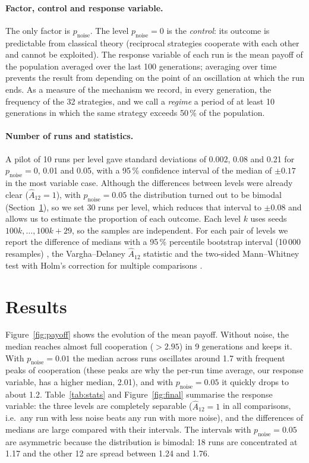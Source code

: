 \documentclass[10pt,a4paper]{article}
\newcommand{\pn}{p_{\text{noise}}}
\newcommand{\Atwelve}{\hat{A}_{12}}
\begin{document}
\paragraph{Factor, control and response variable.} The only factor is $\pn$. The level $\pn=0$ is the
\emph{control}: its outcome is predictable from classical theory \cite{axelrod1987} (reciprocal strategies
cooperate with each other and cannot be exploited). The response variable of each run is the mean payoff of
the population averaged over the last 100 generations; averaging over time prevents the result from
depending on the point of an oscillation at which the run ends. As a measure of the mechanism we record, in
every generation, the frequency of the 32 strategies, and we call a \emph{regime} a period of at least 10
generations in which the same strategy exceeds 50\,\% of the population.

\paragraph{Number of runs and statistics.} A pilot of 10 runs per level gave standard deviations of 0.002,
0.08 and 0.21 for $\pn=0$, 0.01 and 0.05, with a 95\,\% confidence interval of the median of $\pm0.17$ in
the most variable case. Although the differences between levels were already clear ($\Atwelve=1$), with
$\pn=0.05$ the distribution turned out to be bimodal (Section~\ref{sec:res}), so we set 30 runs per level,
which reduces that interval to $\pm0.08$ and allows us to estimate the proportion of each outcome. Each
level $k$ uses seeds $100k,\dots,100k+29$, so the samples are independent. For each pair of levels we report
the difference of medians with a 95\,\% percentile bootstrap interval (10\,000 resamples) \cite{efron1993},
the Vargha--Delaney $\Atwelve$ statistic \cite{vargha2000,arcuri2011} and the two-sided Mann--Whitney test
with Holm's correction for multiple comparisons \cite{holm1979}.

\section{Results}\label{sec:res}
Figure~\ref{fig:payoff} shows the evolution of the mean payoff. Without noise, the median reaches almost
full cooperation ($>2.95$) in 9 generations and keeps it. With $\pn=0.01$ the median across runs oscillates
around 1.7 with frequent peaks of cooperation (these peaks are why the per-run time average, our response
variable, has a higher median, 2.01), and with $\pn=0.05$ it quickly drops to about 1.2.
Table~\ref{tab:stats} and Figure~\ref{fig:final} summarise the response variable: the three levels are
completely separable ($\Atwelve=1$ in all comparisons, i.e.\ any run with less noise beats any run with more
noise), and the differences of medians are large compared with their intervals. The intervals with
$\pn=0.05$ are asymmetric because the distribution is bimodal: 18 runs are concentrated at 1.17 and the
other 12 are spread between 1.24 and 1.76.
\end{document}
